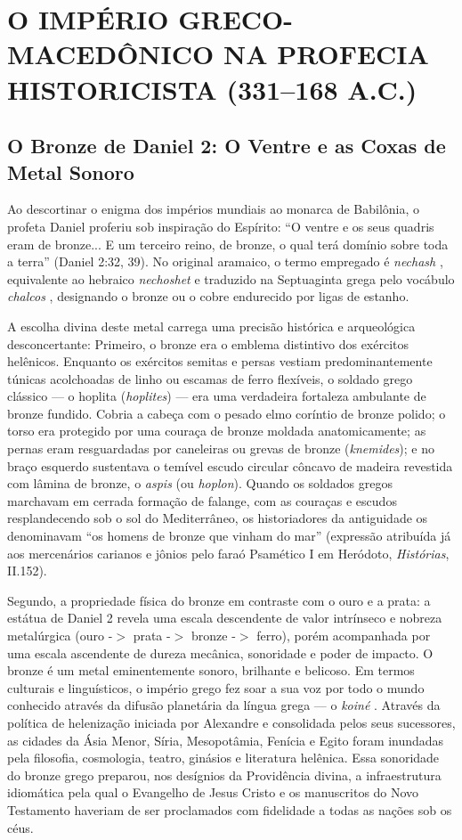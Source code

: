 \documentclass[11pt,a4paper,openany]{book}
\begin{document}
\section{O IMPÉRIO GRECO-MACEDÔNICO NA PROFECIA HISTORICISTA (331–168 A.C.)}



\subsection{O Bronze de Daniel 2: O Ventre e as Coxas de Metal Sonoro}


Ao descortinar o enigma dos impérios mundiais ao monarca de Babilônia, o profeta Daniel proferiu sob inspiração do Espírito: ``O ventre e os seus quadris eram de bronze... E um terceiro reino, de bronze, o qual terá domínio sobre toda a terra'' (Daniel 2:32, 39). No original aramaico, o termo empregado é \textit{nechash} , equivalente ao hebraico \textit{nechoshet} e traduzido na Septuaginta grega pelo vocábulo \textit{chalcos} , designando o bronze ou o cobre endurecido por ligas de estanho.

A escolha divina deste metal carrega uma precisão histórica e arqueológica desconcertante:
Primeiro, o bronze era o emblema distintivo dos exércitos helênicos. Enquanto os exércitos semitas e persas vestiam predominantemente túnicas acolchoadas de linho ou escamas de ferro flexíveis, o soldado grego clássico — o hoplita (\textit{hoplites}) — era uma verdadeira fortaleza ambulante de bronze fundido. Cobria a cabeça com o pesado elmo coríntio de bronze polido; o torso era protegido por uma couraça de bronze moldada anatomicamente; as pernas eram resguardadas por caneleiras ou grevas de bronze (\textit{knemides}); e no braço esquerdo sustentava o temível escudo circular côncavo de madeira revestida com lâmina de bronze, o \textit{aspis} (ou \textit{hoplon}). Quando os soldados gregos marchavam em cerrada formação de falange, com as couraças e escudos resplandecendo sob o sol do Mediterrâneo, os historiadores da antiguidade os denominavam ``os homens de bronze que vinham do mar'' (expressão atribuída já aos mercenários carianos e jônios pelo faraó Psamético I em Heródoto, \textit{Histórias}, II.152).

Segundo, a propriedade física do bronze em contraste com o ouro e a prata: a estátua de Daniel 2 revela uma escala descendente de valor intrínseco e nobreza metalúrgica (ouro -$>$ prata -$>$ bronze -$>$ ferro), porém acompanhada por uma escala ascendente de dureza mecânica, sonoridade e poder de impacto. O bronze é um metal eminentemente sonoro, brilhante e belicoso. Em termos culturais e linguísticos, o império grego fez soar a sua voz por todo o mundo conhecido através da difusão planetária da língua grega — o \textit{koiné} . Através da política de helenização iniciada por Alexandre e consolidada pelos seus sucessores, as cidades da Ásia Menor, Síria, Mesopotâmia, Fenícia e Egito foram inundadas pela filosofia, cosmologia, teatro, ginásios e literatura helênica. Essa sonoridade do bronze grego preparou, nos desígnios da Providência divina, a infraestrutura idiomática pela qual o Evangelho de Jesus Cristo e os manuscritos do Novo Testamento haveriam de ser proclamados com fidelidade a todas as nações sob os céus.
\end{document}
